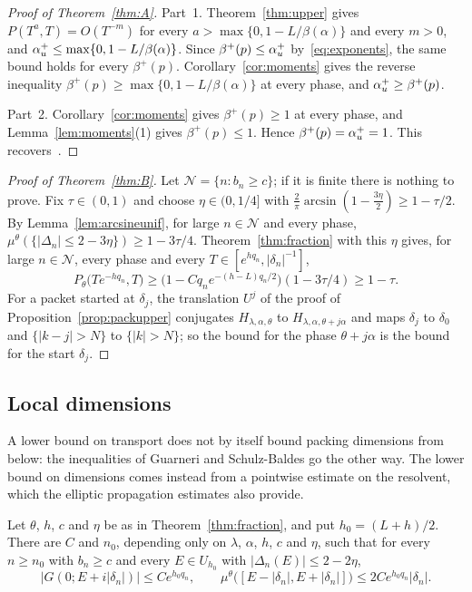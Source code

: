 \begin{proof}[Proof of Theorem~\ref{thm:A}]
Part~1. Theorem~\ref{thm:upper} gives $P(T^a,T)=O(T^{-m})$ for every $a>\max\{0,1-L/\beta(\alpha)\}$ and every $m>0$, and $\alpha_u^+\le\max\{0,1-L/\beta(\alpha)\}$. Since $\beta^+(p)\le\alpha_u^+$ by~\eqref{eq:exponents}, the same bound holds for every $\beta^+(p)$. Corollary~\ref{cor:moments} gives the reverse inequality $\beta^+(p)\ge\max\{0,1-L/\beta(\alpha)\}$ at every phase, and $\alpha_u^+\ge\beta^+(p)$.

Part~2. Corollary~\ref{cor:moments} gives $\beta^+(p)\ge1$ at every phase, and Lemma~\ref{lem:moments}(1) gives $\beta^+(p)\le1$. Hence $\beta^+(p)=\alpha_u^+=1$. This recovers~\cite[Corollary~3]{JZ2022}.
\end{proof}

\begin{proof}[Proof of Theorem~\ref{thm:B}]
Let $\mathcal N=\{n:b_n\ge c\}$; if it is finite there is nothing to prove. Fix $\tau\in(0,1)$ and choose $\eta\in(0,1/4]$ with $\frac2\pi\arcsin(1-\frac{3\eta}2)\ge1-\tau/2$. By Lemma~\ref{lem:arcsineunif}, for large $n\in\mathcal N$ and every phase, $\mu^\theta(\{|\Delta_n|\le2-3\eta\})\ge1-3\tau/4$. Theorem~\ref{thm:fraction} with this $\eta$ gives, for large $n\in\mathcal N$, every phase and every $T\in[e^{hq_n},|\delta_n|^{-1}]$,
\[
P_\theta\bigl(Te^{-hq_n},T\bigr)\ge\bigl(1-Cq_ne^{-(h-L)q_n/2}\bigr)(1-3\tau/4)\ge1-\tau .
\]
For a packet started at $\delta_j$, the translation $U^j$ of the proof of Proposition~\ref{prop:packupper} conjugates $H_{\lambda,\alpha,\theta}$ to $H_{\lambda,\alpha,\theta+j\alpha}$ and maps $\delta_j$ to $\delta_0$ and $\{|k-j|>N\}$ to $\{|k|>N\}$; so the bound for the phase $\theta+j\alpha$ is the bound for the start $\delta_j$.
\end{proof}

\subsection{Local dimensions}

A lower bound on transport does not by itself bound packing dimensions from below: the inequalities of Guarneri and Schulz-Baldes go the other way. The lower bound on dimensions comes instead from a pointwise estimate on the resolvent, which the elliptic propagation estimates also provide.

\begin{lemma}\label{lem:localmass}
Let $\theta$, $h$, $c$ and $\eta$ be as in Theorem~\ref{thm:fraction}, and put $h_0=(L+h)/2$. There are $C$ and $n_0$, depending only on $\lambda$, $\alpha$, $h$, $c$ and $\eta$, such that for every $n\ge n_0$ with $b_n\ge c$ and every $E\in U_{h_0}$ with $|\Delta_n(E)|\le2-2\eta$,
\[
|G(0;E+i|\delta_n|)|\le Ce^{h_0q_n},\qquad\mu^\theta\bigl([E-|\delta_n|,E+|\delta_n|]\bigr)\le2Ce^{h_0q_n}|\delta_n| .
\]
\end{lemma}

